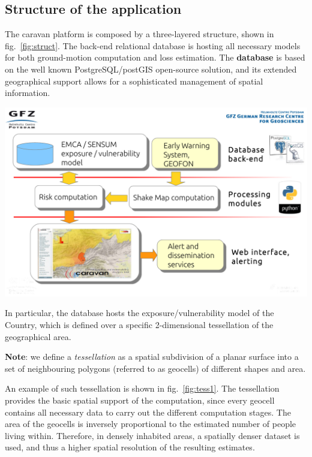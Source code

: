 \documentclass[12p]{article}
\begin{document}
\subsection{Structure of the application}
\label{sec:intro/structure}
The caravan platform is composed by a three-layered structure, shown in
fig.~\ref{fig:struct}. The back-end relational database is hosting all necessary
models for both ground-motion computation and loss estimation. The
\textbf{database} is based on the well known PostgreSQL/postGIS open-source
solution, and its extended geographical support allows for a sophisticated
management of spatial information. 
\begin{center}
	\includegraphics[width=\textwidth]{struct_01}
	
\end{center}
In particular, the database hosts the exposure/vulnerability model of the
Country, which is defined over a specific 2-dimensional tessellation of the
geographical area.

\textbf{Note}: we define a \emph{tessellation} as a spatial subdivision of a planar surface into a set of neighbouring
polygons (referred to as geocells) of different shapes and area. 

An example of
such tessellation is shown in fig.~\ref{fig:tess1}. The tessellation provides
the basic spatial support of the computation, since every geocell contains all
necessary data to carry out the different computation stages. The area of the
geocells is inversely proportional to the estimated number of people living
within. Therefore, in densely inhabited areas, a spatially denser dataset is
used, and thus a higher spatial resolution of the resulting estimates. 
\end{document}
